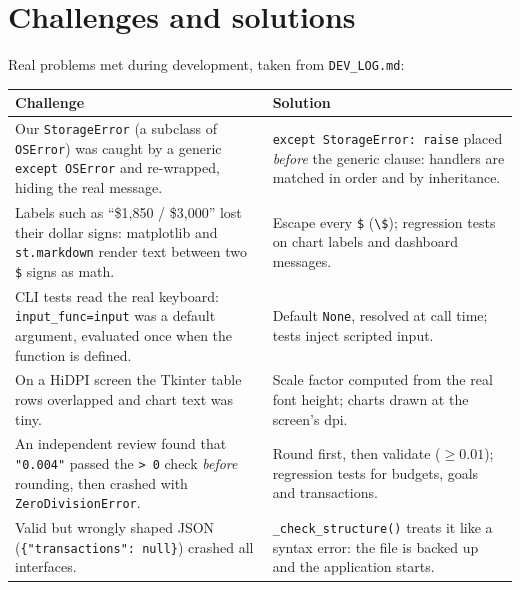 \documentclass[11pt,letterpaper]{article}
\newcommand{\code}[1]{\texttt{#1}}
\begin{document}
\section{Challenges and solutions}
Real problems met during development, taken from \code{DEV\_LOG.md}:

{\small
\begin{tabularx}{\linewidth}{@{}YY@{}}
\toprule
\textbf{Challenge} & \textbf{Solution} \\
\midrule
Our \code{StorageError} (a subclass of \code{OSError}) was caught by a generic
\code{except OSError} and re-wrapped, hiding the real message. &
\code{except StorageError: raise} placed \emph{before} the generic clause: handlers are
matched in order and by inheritance. \\
Labels such as ``\$1,850 / \$3,000'' lost their dollar signs: matplotlib and
\code{st.markdown} render text between two \code{\$} signs as math. &
Escape every \code{\$} (\code{\textbackslash\$}); regression tests on chart labels and
dashboard messages. \\
CLI tests read the real keyboard: \code{input\_func=input} was a default argument,
evaluated once when the function is defined. &
Default \code{None}, resolved at call time; tests inject scripted input. \\
On a HiDPI screen the Tkinter table rows overlapped and chart text was tiny. &
Scale factor computed from the real font height; charts drawn at the screen's dpi. \\
An independent review found that \code{"0.004"} passed the \code{> 0} check
\emph{before} rounding, then crashed with \code{ZeroDivisionError}. &
Round first, then validate ($\geq 0.01$); regression tests for budgets, goals and
transactions. \\
Valid but wrongly shaped JSON (\code{\{"transactions": null\}}) crashed all interfaces. &
\code{\_check\_structure()} treats it like a syntax error: the file is backed up and the
application starts. \\
\bottomrule
\end{tabularx}}

\end{document}
